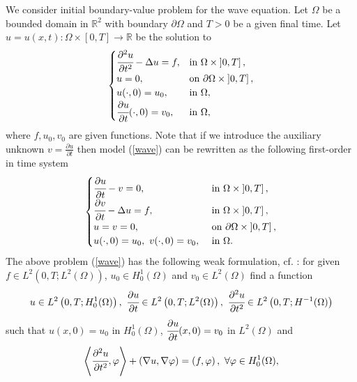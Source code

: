 \documentclass{imanum}
\begin{document}
We consider initial boundary-value problem for the wave equation. Let $\Omega$ be a bounded domain in $\mathbb{R}^2$ with boundary $\partial \Omega$ and $T>0$ be a given final time. Let $u=u(x,t) : \Omega\times\left[0,T \right]\to\mathbb{R}$ be the solution to
\begin{equation}
   \begin{cases}
      \cfrac{\partial^2 u}{\partial t^2}-\Delta u=f,&\mbox{in}~ \Omega\times\left]0,T     \right],\\
      u=0,&\mbox{on}~ \partial\Omega\times\left]0,T \right],\\
      u(\cdot,0)=u_0,&\mbox{in}~\Omega,\\
      \cfrac{\partial u}{\partial t}(\cdot,0)=v_0,&\mbox{in}~\Omega,
   \end{cases}
   \label{wave}
\end{equation}
where $f,u_0,v_0$ are given functions. Note that if we introduce the auxiliary unknown $v=\frac{\partial u}{\partial t}$ then model (\ref{wave}) can be rewritten as the following first-order in time system 
\begin{equation}
   \begin{cases}
      \cfrac{\partial u}{\partial t}-v=0,  &\mbox{in}~ \Omega\times\left]0,T \right], \\
      \cfrac{\partial v}{\partial t}-\Delta u=f,  &\mbox{in}~ \Omega\times\left]0,T \right], \\
      u=v=0,&\mbox{on}~ \partial\Omega\times\left]0,T \right]  ,\\
      u(\cdot,0)=u_0,~v(\cdot,0)=v_0,~&\mbox{in}~\Omega.
      \label{syst}
   \end{cases}
\end{equation}
The above problem (\ref{wave}) has the following weak formulation, cf. \cite{evans2010partial}: for given  \newline 
$f\in L^{2}(0,T;L^2(\Omega))$, $u_0\in H^1_0(\Omega)$ and $v_0\in L^2(\Omega)$ find a function 
\begin{equation}
   u\in L^{2}\left(0,T;H^1_0(\Omega)\right),~\cfrac{\partial u}{\partial t}\in L^{2}\left(0,T;L^2(\Omega)\right),~\cfrac{\partial^2 u}{\partial t^2}\in L^{2}\left(0,T;H^{-1}(\Omega)\right)
\end{equation}
such that $u(x,0)=u_0$ in $H^1_0(\Omega)$, $\cfrac{\partial u}{\partial t}(x,0)=v_0$ in $L^2(\Omega)$ and
\begin{equation}
   \left\langle\cfrac{\partial^2 u}{\partial t^2},\varphi\right\rangle+\left(\nabla u,\nabla \varphi\right)=\left(f,\varphi\right),~\forall\varphi  \in H^1_0(\Omega),
   \label{weakwave}
\end{equation}
\end{document}
